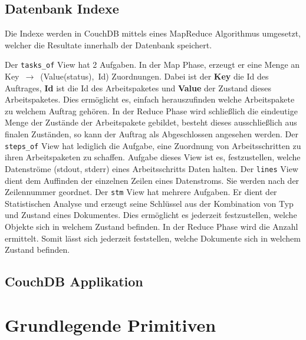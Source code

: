 \subsection{Datenbank Indexe}

Die Indexe werden in CouchDB mittels 
eines MapReduce \cite{couchdb:views} Algorithmus umgesetzt,
welcher die Resultate innerhalb der Datenbank speichert.

\begin{description}
    \dhitem[tasks\_of]
        Der \verb|tasks_of| View hat 2 Aufgaben.
        In der Map Phase, erzeugt er eine Menge an \hbox{Key $\rightarrow$ (Value(status), Id)} Zuordnungen.
        Dabei ist der \textbf{Key} die Id des Auftrages,
        \textbf{Id} ist die Id des Arbeitspaketes
        und \textbf{Value} der Zustand dieses Arbeitspaketes.
        Dies ermöglicht es, einfach herauszufinden
        welche Arbeitspakete zu welchem Auftrag gehören.
        In der Reduce Phase wird schließlich die eindeutige Menge
        der Zustände der Arbeitspakete gebildet,
        besteht dieses ausschließlich aus finalen Zuständen,
        so kann der Auftrag als Abgeschlossen angesehen werden.
    \dhitem[steps\_of]
        Der \verb|steps_of| View hat lediglich die Aufgabe,
        eine Zuordnung von Arbeitsschritten
        zu ihren Arbeitspaketen zu schaffen.
    \dhitem[streams]
        Aufgabe dieses View ist es,
        festzustellen, welche Datenströme (stdout, stderr)
        eines Arbeitsschritts Daten halten.
    \dhitem[lines]
        Der \verb|lines| View dient dem Auffinden der einzelnen Zeilen
        eines Datenstroms. Sie werden nach der Zeilennummer geordnet.
    \dhitem[stm]
        Der \verb|stm| View hat mehrere Aufgaben.
        Er dient der Statistischen Analyse und
        erzeugt seine Schlüssel aus der Kombination
        von Typ und Zustand eines Dokumentes.
        Dies ermöglicht es jederzeit festzustellen,
        welche Objekte sich in welchem Zustand befinden.
        In der Reduce Phase wird die Anzahl ermittelt.
        Somit lässt sich jederzeit feststellen,
        welche Dokumente sich in welchem Zustand befinden.
\end{description}

\subsection{CouchDB Applikation}

\section{Grundlegende Primitiven}

